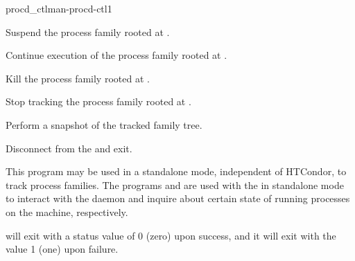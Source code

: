 \begin{ManPage}{procd\_ctl}{man-procd-ctl}{1}
\begin{Options}
  {Suspend the process family rooted at .}

  {Continue execution of the process family rooted at .}

  {Kill the process family rooted at .}

  {Stop tracking the process family rooted at .}

  {Perform a snapshot of the tracked family tree.}

  {Disconnect from the  and exit.}

\end{Options}
	

\GenRem

This program may be used in a standalone mode, independent of
HTCondor, to track process families. The programs  and
 are used with the  in standalone mode
to interact with the daemon and inquire about certain state of running
processes on the machine, respectively.

\ExitStatus

 will exit with a status value of 0 (zero) upon success,
and it will exit with the value 1 (one) upon failure.

\end{ManPage}
